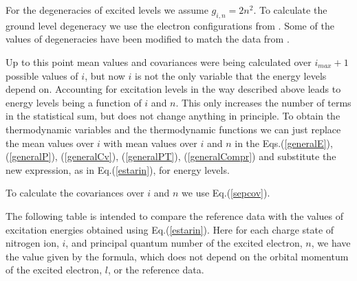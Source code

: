 For the degeneracies of excited levels we assume $g_{i,n} = 2 n^2$. To calculate the
ground level degeneracy we use the electron configurations from \cite{Carlson}.
Some of the values of degeneracies have been modified to match the data from \cite{allenAQ}.

Up to this point mean values and covariances were being calculated over $i_{max}+1$ possible
values of $i$, but now $i$ is not the only variable that the energy levels depend on.
Accounting for excitation levels in the way described above leads to energy levels
being a function of $i$ and $n$.
This only increases the number of terms in the statistical sum, but does not change
anything in principle. To obtain the thermodynamic variables and the thermodynamic functions
we can just replace the mean values over $i$ with mean values over $i$ and $n$ in the
Eqs.(\ref{generalE}), (\ref{generalP}), (\ref{generalCv}),
(\ref{generalPT}), (\ref{generalCompr}) and substitute the new expression, as in Eq.(\ref{estarin}), 
for energy levels.

To calculate the covariances over $i$ and $n$ we use Eq.(\ref{sepcov}).

The following table is intended to compare the reference data with
the values of excitation energies obtained using Eq.(\ref{estarin}). Here for each
charge state of nitrogen ion, $i$, and principal quantum number of the excited
electron, $n$, we have the value given by the formula, which does not depend on the
orbital momentum of the excited electron, $l$, or the reference data.


